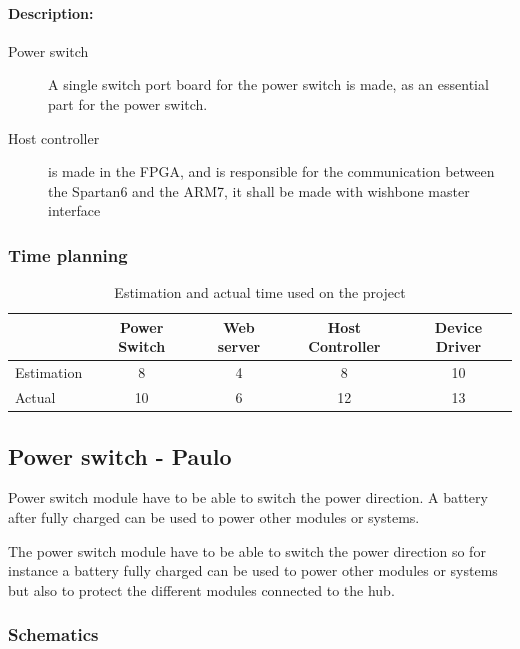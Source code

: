 \paragraph{Description:}
\begin{description}
	\item[Power switch] A single switch port board for the power switch is made, as an essential part for the power switch.
	\item[Host controller] is made in the FPGA, and is responsible for the communication between the Spartan6 and the ARM7, it shall be made with wishbone master interface 
\end{description}

\subsubsection{Time planning}
\begin{table}[H]
\centering
	\begin{tabular}{|l|c|c|c|c|}
		\hline
		~			& Power Switch	& Web server	& Host Controller 	& Device Driver\\ \hline
		Estimation	& 8				& 4			& 8				& 10\\
		Actual		& 10				& 6			& 12				& 13\\
		\hline
	\end{tabular}
	\caption{Estimation and actual time used on the project}
\end{table}

\subsection{Power switch - Paulo}
Power switch module have to be able to switch the power direction. A battery after fully charged can be used to power other modules or systems.

The power switch module have to be able to switch the power direction so for instance a battery fully charged can be used to power other modules or systems but also to protect the different modules connected to the hub.

\subsubsection{Schematics}

